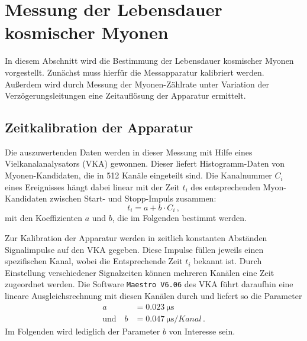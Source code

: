 \section{Messung der Lebensdauer kosmischer Myonen}
\label{sec:messung}
In diesem Abschnitt wird die Bestimmung der Lebensdauer kosmischer Myonen
vorgestellt.
Zunächst muss hierfür die Messapparatur kalibriert werden.
Außerdem wird durch Messung der Myonen-Zählrate unter Variation der
Verzögerungsleitungen eine Zeitauflösung der Apparatur ermittelt.

\subsection{Zeitkalibration der Apparatur}
\label{subsec:kalibration}
Die auszuwertenden Daten werden in dieser Messung mit Hilfe eines
Vielkanalanalysators (VKA) gewonnen.
Dieser liefert Histogramm-Daten von Myonen-Kandidaten, die in \num{512} Kanäle
eingeteilt sind.
Die Kanalnummer $C_i$ eines Ereignisses hängt dabei linear mit der
Zeit $t_i$ des entsprechenden Myon-Kandidaten zwischen Start- und
Stopp-Impuls zusammen:
\begin{equation}
    t_i = a + b \cdot C_i\,,
\end{equation}
mit den Koeffizienten $a$ und $b$, die im Folgenden bestimmt werden.

Zur Kalibration der Apparatur werden in zeitlich konstanten Abständen
Signalimpulse auf den VKA gegeben.
Diese Impulse füllen jeweils einen spezifischen Kanal, wobei die Entsprechende
Zeit $t_i$ bekannt ist.
Durch Einstellung verschiedener Signalzeiten können mehreren Kanälen eine
Zeit zugeordnet werden.
Die Software \texttt{Maestro V6.06} des VKA führt daraufhin eine lineare Ausgleichsrechnung mit diesen
Kanälen durch und liefert so die Parameter
\begin{align*}
     a &= \SI{0.023}{\micro \second}\\
     \text{und} \quad b &= \SI[per-mode=fraction]{0.047}{\micro \second \per {Kanal}} \,.
 \end{align*}
 Im Folgenden wird lediglich der Parameter $b$ von Interesse sein.

